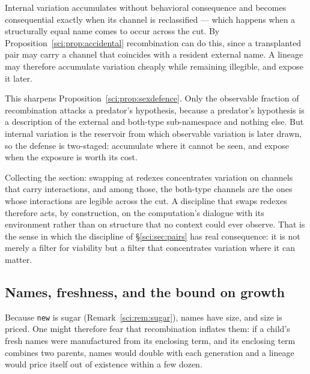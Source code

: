 \begin{corollary}
\label{sci:cor:cryptic}
Internal variation accumulates without behavioral consequence and becomes consequential exactly when
its channel is reclassified --- which happens when a structurally equal name comes to occur across the
cut. By Proposition~\ref{sci:prop:accidental} recombination can do this, since a transplanted pair may
carry a channel that coincides with a resident external name. A lineage may therefore accumulate
variation cheaply while remaining illegible, and expose it later.
\end{corollary}

This sharpens Proposition~\ref{sci:prop:sexdefence}. Only the observable fraction of recombination attacks
a predator's hypothesis, because a predator's hypothesis is a description of the external and
both-type sub-namespace and nothing else. But internal variation is the reservoir from which
observable variation is later drawn, so the defense is two-staged: accumulate where it cannot be seen,
and expose when the exposure is worth its cost.

\begin{remark}
\label{sci:rem:impact}
Collecting the section: swapping at redexes concentrates variation on channels that carry
interactions, and among those, the both-type channels are the ones whose interactions are legible
across the cut. A discipline that swaps redexes therefore acts, by construction, on the computation's
dialogue with its environment rather than on structure that no context could ever observe. That is the
sense in which the discipline of \S\ref{sci:sec:pairs} has real consequence: it is not merely a filter for
viability but a filter that concentrates variation where it can matter.
\end{remark}

\subsection{Names, freshness, and the bound on growth}\label{sci:S12.7}

Because \texttt{new} is sugar (Remark~\ref{sci:rem:sugar}), names have size, and size is priced. One might
therefore fear that recombination inflates them: if a child's fresh names were manufactured from its
enclosing term, and its enclosing term combines two parents, names would double with each generation
and a lineage would price itself out of existence within a few dozen.

